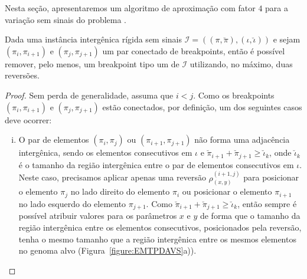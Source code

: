 Nesta seção, apresentaremos um algoritmo de aproximação com fator $4$ para a variação sem sinais do problema \SbIR{}.

\begin{lemma}\label{lemma:IMYFBWDY}
Dada uma instância intergênica rígida sem sinais $\mathcal{I}=((\pi,\breve\pi),(\iota,\breve\iota))$ e sejam $(\pi_i,\pi_{i+1})$ e $(\pi_j,\pi_{j+1})$ um par conectado de breakpoints, então é possível remover, pelo menos, um breakpoint tipo um de $\mathcal{I}$ utilizando, no máximo, duas reversões.
\end{lemma}
\begin{proof}
Sem perda de generalidade, assuma que $i < j$. Como os breakpoints $(\pi_i,\pi_{i+1})$ e $(\pi_j,\pi_{j+1})$ estão conectados, por definição, um dos seguintes casos deve ocorrer:
\begin{enumerate}[i.]
    \item O par de elementos $(\pi_i,\pi_{j})$ ou $(\pi_{i+1},\pi_{j+1})$ não forma uma adjacência intergênica, sendo os elementos consecutivos em $\iota$ e $\breve\pi_{i+1} + \breve\pi_{j+1} \ge \breve\iota_k$, onde $\breve\iota_k$ é o tamanho da região intergênica entre o par de elementos consecutivos em $\iota$. Neste caso, precisamos aplicar apenas uma reversão $\rho^{(i+1,j)}_{(x,y)}$ para posicionar o elemento $\pi_{j}$ no lado direito do elemento $\pi_{i}$ ou posicionar o elemento $\pi_{i+1}$ no lado esquerdo do elemento $\pi_{j+1}$. Como $\breve\pi_{i+1} + \breve\pi_{j+1} \ge \breve\iota_k$, então sempre é possível atribuir valores para os parâmetros $x$ e $y$ de forma que o tamanho da região intergênica entre os elementos consecutivos, posicionados pela reversão, tenha o mesmo tamanho que a região intergênica entre os mesmos elementos no genoma alvo (Figura~\ref{figure:EMTPDAVS}a)).  

\end{enumerate}
\end{proof}
